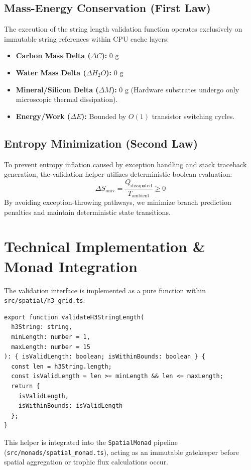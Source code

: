 \documentclass[11pt, a4paper]{article}
\begin{document}
\subsection{Mass-Energy Conservation (First Law)}
The execution of the string length validation function operates exclusively on immutable string references within CPU cache layers:
\begin{itemize}
    \item \textbf{Carbon Mass Delta ($\Delta C$):} $0\text{ g}$
    \item \textbf{Water Mass Delta ($\Delta H_2O$):} $0\text{ g}$
    \item \textbf{Mineral/Silicon Delta ($\Delta M$):} $0\text{ g}$ (Hardware substrates undergo only microscopic thermal dissipation).
    \item \textbf{Energy/Work ($\Delta E$):} Bounded by $O(1)$ transistor switching cycles.
\end{itemize}

\subsection{Entropy Minimization (Second Law)}
To prevent entropy inflation caused by exception handling and stack traceback generation, the validation helper utilizes deterministic boolean evaluation:
\begin{equation}
\Delta S_{\text{univ}} = \frac{Q_{\text{dissipated}}}{T_{\text{ambient}}} \ge 0
\end{equation}
By avoiding exception-throwing pathways, we minimize branch prediction penalties and maintain deterministic state transitions.

\section{Technical Implementation \& Monad Integration}
The validation interface is implemented as a pure function within \texttt{src/spatial/h3\_grid.ts}:

\begin{verbatim}
export function validateH3StringLength(
  h3String: string,
  minLength: number = 1,
  maxLength: number = 15
): { isValidLength: boolean; isWithinBounds: boolean } {
  const len = h3String.length;
  const isValidLength = len >= minLength && len <= maxLength;
  return {
    isValidLength,
    isWithinBounds: isValidLength
  };
}
\end{verbatim}

This helper is integrated into the \texttt{SpatialMonad} pipeline (\texttt{src/monads/spatial\_monad.ts}), acting as an immutable gatekeeper before spatial aggregation or trophic flux calculations occur.
\end{document}
